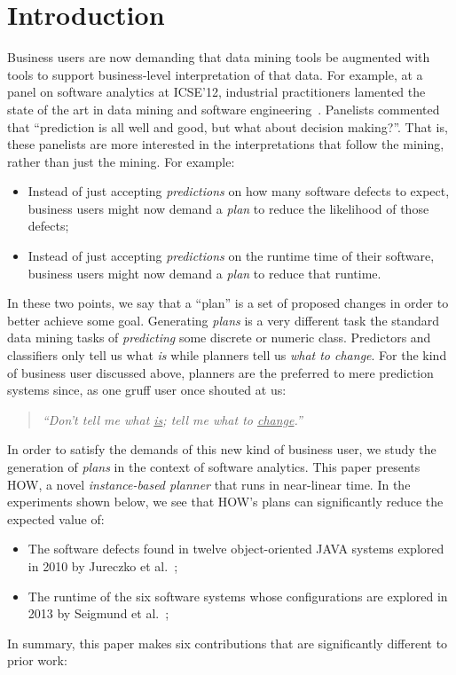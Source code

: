 \documentclass[conference]{IEEEtran}
\newcommand{\bi}{\begin{itemize}}
\newcommand{\ei}{\end{itemize}}
\begin{document}
\section{Introduction}
Business  users are now demanding that data mining tools
be augmented with tools to support  business-level
interpretation of that data. For example,
at a  panel on software analytics at ICSE'12,
industrial practitioners lamented the state of the art in data mining
and software engineering~\cite{menzies12a}. Panelists commented that
``prediction is all well and good, but what about decision
making?''. That is, these panelists are more interested in the interpretations
that follow the mining, rather than just  the mining. For example:
\bi
\item Instead of just accepting  {\em predictions} on how many 
 software defects
to expect,  business users might now demand a {\em plan} to
reduce the likelihood of those defects;
\item Instead of just accepting {\em predictions} on the runtime
time of their software, business users might now demand
a {\em plan} to reduce that runtime.
\ei
In these two points, we say that a ``plan'' is a  set of proposed changes in order to better achieve some goal. 
Generating {\em plans} is a  very different task the standard
data mining tasks of {\em predicting} some discrete or numeric class.
Predictors
and classifiers only tell us what {\em is} while planners 
  tell us {\em what to change}. For the kind of business user
discussed above, planners are the preferred to mere prediction systems
since, as one gruff user once shouted at us:
\begin{quote}
{\em ``Don't tell me what \underline{is};
tell me what to \underline{change}.''}
\end{quote}
In order to satisfy the demands of this new kind of business user, we  study the generation of {\em plans} in the context
of software analytics.  
This paper presents
HOW, a novel  {\em instance-based planner} that runs in near-linear time.
In the experiments shown below, we see that HOW's plans can
significantly reduce the expected
value of:
\bi
\item The software defects found in  twelve object-oriented JAVA systems explored in 2010 by Jureczko et al.~\cite{jureczko10};
\item The runtime of the six software systems whose configurations
are explored in 2013 by Seigmund et al.~\cite{sven12};
\ei
In summary, this paper makes six contributions that are significantly different to
prior work:
\end{document}

